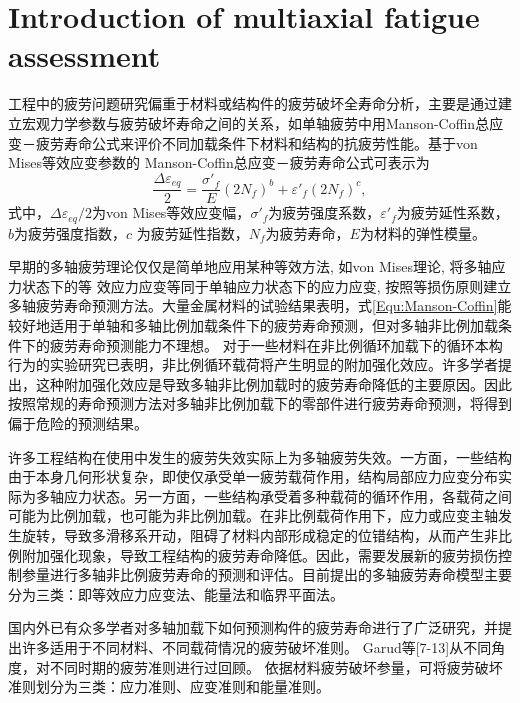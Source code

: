 \section{Introduction of multiaxial fatigue assessment}

工程中的疲劳问题研究偏重于材料或结构件的疲劳破坏全寿命分析，主要是通过建立宏观力学参数与疲劳破坏寿命之间的关系，如单轴疲劳中用Manson-Coffin总应变－疲劳寿命公式来评价不同加载条件下材料和结构的抗疲劳性能。基于von Mises等效应变参数的 Manson-Coffin总应变－疲劳寿命公式可表示为
\begin{equation}
\frac{{\Delta {\varepsilon _{eq}}}}{2} = \frac{{{{\sigma '}_f}}}{E}{\left( {2{N_f}} \right)^b} + {{\varepsilon '}_f}{\left( {2{N_f}} \right)^c},
\label{Equ:Manson-Coffin}
\end{equation}
式中，$\Delta {\varepsilon _{eq}}/2$为von Mises等效应变幅，${\sigma '}_f$为疲劳强度系数，${\varepsilon '}_f$为疲劳延性系数，$b$为疲劳强度指数，$c$
为疲劳延性指数，$N_f$为疲劳寿命，$E$为材料的弹性模量。

早期的多轴疲劳理论仅仅是简单地应用某种等效方法, 如von Mises理论, 将多轴应力状态下的等
效应力应变等同于单轴应力状态下的应力应变, 按照等损伤原则建立多轴疲劳寿命预测方法。大量金属材料的试验结果表明，式\ref{Equ:Manson-Coffin}能较好地适用于单轴和多轴比例加载条件下的疲劳寿命预测，但对多轴非比例加载条件下的疲劳寿命预测能力不理想。
对于一些材料在非比例循环加载下的循环本构行为的实验研究\cite{tanaka1985effects,xia1991nonproportional}已表明，非比例循环载荷将产生明显的附加强化效应。许多学者\cite{Fatemi1988,socie1987multiaxial,chen1994damage}提出，这种附加强化效应是导致多轴非比例加载时的疲劳寿命降低的主要原因。因此按照常规的寿命预测方法对多轴非比例加载下的零部件进行疲劳寿命预测，将得到偏于危险的预测结果。

许多工程结构在使用中发生的疲劳失效实际上为多轴疲劳失效。一方面，一些结构由于本身几何形状复杂，即使仅承受单一疲劳载荷作用，结构局部应力应变分布实际为多轴应力状态。另一方面，一些结构承受着多种载荷的循环作用，各载荷之间可能为比例加载，也可能为非比例加载。在非比例载荷作用下，应力或应变主轴发生旋转，导致多滑移系开动，阻碍了材料内部形成稳定的位错结构，从而产生非比例附加强化现象，导致工程结构的疲劳寿命降低。因此，需要发展新的疲劳损伤控制参量进行多轴非比例疲劳寿命的预测和评估。目前提出的多轴疲劳寿命模型主要分为三类：即等效应力应变法、能量法和临界平面法。

国内外已有众多学者对多轴加载下如何预测构件的疲劳寿命进行了广泛研究，并提出许多适用于不同材料、不同载荷情况的疲劳破坏准则。
Garud等[7-13]从不同角度，对不同时期的疲劳准则进行过回顾。
依据材料疲劳破坏参量，可将疲劳破坏准则划分为三类：应力准则、应变准则和能量准则。
